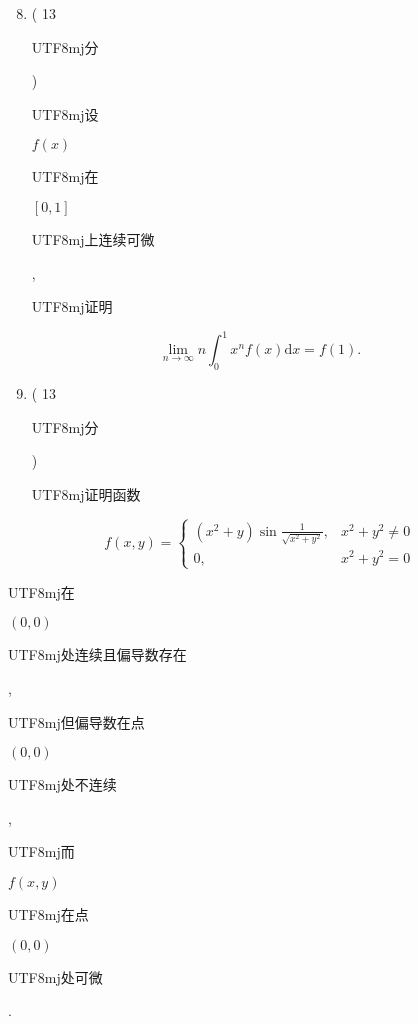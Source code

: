 \documentclass[10pt]{article}
\begin{document}
\begin{enumerate}
  \setcounter{enumi}{7}
  \item ( 13 \begin{CJK}{UTF8}{mj}分\end{CJK}) \begin{CJK}{UTF8}{mj}设\end{CJK} $f(x)$ \begin{CJK}{UTF8}{mj}在\end{CJK} $[0,1]$ \begin{CJK}{UTF8}{mj}上连续可微\end{CJK}, \begin{CJK}{UTF8}{mj}证明\end{CJK}
\end{enumerate}
$$
\lim _{n \rightarrow \infty} n \int_{0}^{1} x^{n} f(x) \mathrm{d} x=f(1) .
$$

\begin{enumerate}
  \setcounter{enumi}{8}
  \item ( 13 \begin{CJK}{UTF8}{mj}分\end{CJK}) \begin{CJK}{UTF8}{mj}证明函数\end{CJK}
\end{enumerate}
$$
f(x, y)=\left\{\begin{array}{cc}
\left(x^{2}+y\right) \sin \frac{1}{\sqrt{x^{2}+y^{2}}}, & x^{2}+y^{2} \neq 0 \\
0, & x^{2}+y^{2}=0
\end{array}\right.
$$
\begin{CJK}{UTF8}{mj}在\end{CJK} $(0,0)$ \begin{CJK}{UTF8}{mj}处连续且偏导数存在\end{CJK}, \begin{CJK}{UTF8}{mj}但偏导数在点\end{CJK} $(0,0)$ \begin{CJK}{UTF8}{mj}处不连续\end{CJK}, \begin{CJK}{UTF8}{mj}而\end{CJK} $f(x, y)$ \begin{CJK}{UTF8}{mj}在点\end{CJK} $(0,0)$ \begin{CJK}{UTF8}{mj}处可微\end{CJK}.
\end{document}
